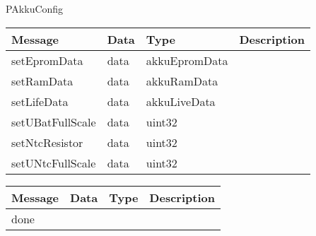  {PAkkuConfig}

\begin{tabular}[ht]{|l|l|l|p{8cm}|}
\hline
Message & Data & Type & Description\\
\hline
setEpromData &  data  &  akkuEpromData  & \\
\hline
setRamData &  data  &  akkuRamData  & \\
\hline
setLifeData &  data  &  akkuLiveData  & \\
\hline
setUBatFullScale &  data  &  uint32  & \\
\hline
setNtcResistor &  data  &  uint32  & \\
\hline
setUNtcFullScale &  data  &  uint32  & \\
\hline
\end{tabular}
\begin{tabular}[ht]{|l|l|l|p{8cm}|}
\hline
Message & Data & Type & Description\\
\hline
done &  &  & \\
\hline
\end{tabular}
